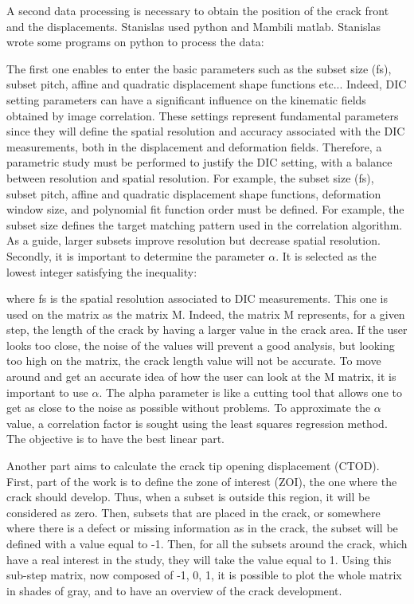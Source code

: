A second data processing is necessary to obtain the position of the crack front and the displacements. Stanislas used python and Mambili matlab. Stanislas wrote some programs on python to process the data:

The first one enables to enter the basic parameters such as the subset size (fs), subset pitch, affine and quadratic displacement shape functions etc... Indeed, DIC setting parameters can have a significant influence on the kinematic fields obtained by image correlation. These settings represent fundamental parameters since they will define the spatial resolution and accuracy associated with the DIC measurements, both in the displacement and deformation fields. Therefore, a parametric study must be performed to justify the DIC setting, with a balance between resolution and spatial resolution. For example, the subset size (fs), subset pitch, affine and quadratic displacement shape functions, deformation window size, and polynomial fit function order must be defined. For example, the subset size defines the target matching pattern used in the correlation algorithm. As a guide, larger subsets improve resolution but decrease spatial resolution. 
Secondly, it is important to determine the parameter $\alpha$. It is selected as the lowest integer satisfying the inequality:



where fs is the spatial resolution associated to DIC measurements. This one is used on the matrix as the matrix M. Indeed, the matrix M represents, for a given step, the length of the crack by having a larger value in the crack area. If the user looks too close, the noise of the values will prevent a good analysis, but looking too high on the matrix, the crack length value will not be accurate. To move around and get an accurate idea of how the user can look at the M matrix, it is important to use $\alpha$. The alpha parameter is like a cutting tool that allows one to get as close to the noise as possible without problems. To approximate the $\alpha$ value, a correlation factor is sought using the least squares regression method. The objective is to have the best linear part.

Another part aims to calculate the crack tip opening displacement (CTOD). First, part of the work is to define the zone of interest (ZOI), the one where the crack should develop. Thus, when a subset is outside this region, it will be considered as zero. Then, subsets that are placed in the crack, or somewhere where there is a defect or missing information as in the crack, the subset will be defined with a value equal to -1. Then, for all the subsets around the crack, which have a real interest in the study, they will take the value equal to 1. Using this sub-step matrix, now composed of -1, 0, 1, it is possible to plot the whole matrix in shades of gray, and to have an overview of the crack development.

